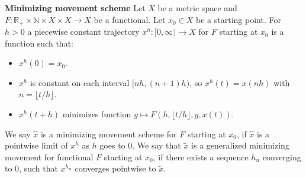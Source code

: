 \begin{definition} \textbf{Minimizing movement scheme}
Let $X$ be a metric space and $F : \mathbb{R_+} \times \mathbb{N} \times X \times X \rightarrow X$ be a functional. Let $x_0 \in X$ be a starting point. For $h> 0$ a piecewise constant trajectory $x^h : [0, \infty) \rightarrow X$ for $F$ starting at $x_0$ is a function such that:
\begin{itemize}
\item $x^h(0) = x_0$.
\item $x^h$ is constant on each interval $[nh, (n+1)h)$, so $x^h(t) = x(nh)$ with $n = \lfloor t/h \rfloor$.
\item $x^h(t +h )$ minimizes function $ y \mapsto F(h, \lfloor t/h \rfloor, y ,x(t))$.
\end{itemize}
We say $\hat{x}$ is a minimizing movement scheme for $F$ starting at $x_0$, if $\hat{x}$ is a pointwise limit of $x^h$ as $h$ goes to $0$. We say that $\tilde{x}$ is a generalized minimizing movement for functional $F$ starting at $x_0$, if there exists a sequence $h_n$ converging to $0$, such that $x^{h_n}$ converges pointwise to $\tilde{x}$.
\end{definition}

